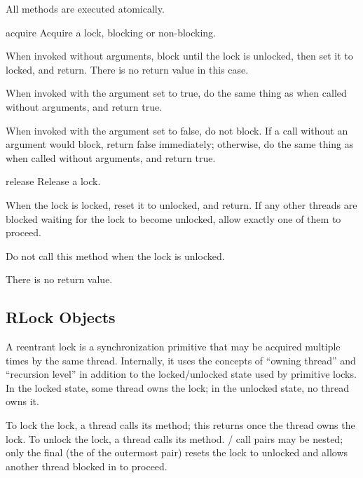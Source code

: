 All methods are executed atomically.

\begin{methoddesc}{acquire}{}
Acquire a lock, blocking or non-blocking.

When invoked without arguments, block until the lock is
unlocked, then set it to locked, and return.  There is no
return value in this case.

When invoked with the  argument set to true, do the
same thing as when called without arguments, and return true.

When invoked with the  argument set to false, do not
block.  If a call without an argument would block, return false
immediately; otherwise, do the same thing as when called
without arguments, and return true.
\end{methoddesc}

\begin{methoddesc}{release}{}
Release a lock.

When the lock is locked, reset it to unlocked, and return.  If
any other threads are blocked waiting for the lock to become
unlocked, allow exactly one of them to proceed.

Do not call this method when the lock is unlocked.

There is no return value.
\end{methoddesc}


\subsection{RLock Objects \label{rlock-objects}}

A reentrant lock is a synchronization primitive that may be
acquired multiple times by the same thread.  Internally, it uses
the concepts of ``owning thread'' and ``recursion level'' in
addition to the locked/unlocked state used by primitive locks.  In
the locked state, some thread owns the lock; in the unlocked
state, no thread owns it.

To lock the lock, a thread calls its  method; this
returns once the thread owns the lock.  To unlock the lock, a
thread calls its  method.
/ call pairs may be nested; only
the final  (the  of the outermost
pair) resets the lock to unlocked and allows another thread blocked in
 to proceed.

